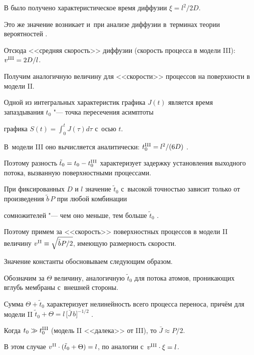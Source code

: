 В \cite{bormatova:bib:Zaika2} было получено характеристическое время диффузии $\xi=l ^2/2D$.

Это же значение возникает и~при анализе диффузии в~терминах теории вероятностей \cite[гл.~V]{bormatova:bib:Zeld}.

Отсюда <<средняя скорость>> диффузии (скорость процесса в модели III): $v^{\rm III}=2D/l $.

Получим аналогичную величину для <<скорости>> процессов на поверхности в модели II.



Одной из интегральных характеристик графика $J(t)$ является время запаздывания $t_0$ "--- точка пересечения асимптоты

графика $S(t)=\displaystyle\int_0^t J(\tau)d\tau$ с~осью $t$.

В~модели III оно вычисляется аналитически: $t_0^{\rm III}=l ^2/(6D)$ \cite{bormatova:bib:Kunin}.

Поэтому разность $\tilde t_0 = t_0-t_0^{\rm III}$ характеризует задержку  установления выходного потока, вызванную поверхностными процессами.

При фиксированных $D$ и $l $ значение $\tilde t_0$ с~высокой точностью зависит только от произведения $\tilde b\, P$ при любой комбинации

сомножителей "--- чем оно меньше, тем больше $\tilde t_0$ \cite{bormatova:bib:Zaika1}.

Поэтому примем за <<скорость>> поверхностных процессов в модели II величину $v^{\rm II}\equiv \sqrt{\tilde bP/2}$, имеющую размерность скорости.

Значение константы обосновываем следующим образом.

Обозначим за $\Theta$ величину, аналогичную $\tilde t_0$ для потока атомов, проникающих вглубь мембраны с~внешней стороны.

Сумма $\Theta+\tilde t_0$ характеризует нелинейность всего процесса переноса, причём для модели II $\tilde {t}_0+\Theta = l  \, \lbrack \bar J \, b

\rbrack^{-1/2}$ \cite{bormatova:bib:Zaika2}.

Когда $t_0\gg t_0^{\rm III}$ (модель II <<далека>> от III), то $\bar J \approx P/2$.

В этом случае $v^{\rm II}\cdot(\tilde t_0+\Theta)=l $, по аналогии с~$v^{\rm III}\cdot\xi=l $.



